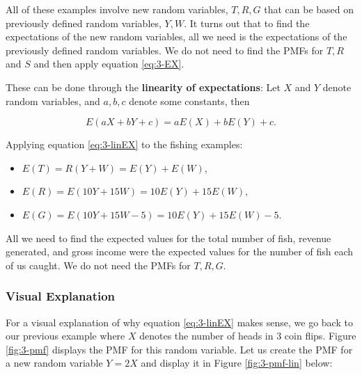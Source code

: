 \documentclass[
]{book}
\providecommand{\tightlist}{%
  \setlength{\itemsep}{0pt}\setlength{\parskip}{0pt}}
\begin{document}
All of these examples involve new random variables, \(T, R, G\) that can be based on previously defined random variables, \(Y, W\). It turns out that to find the expectations of the new random variables, all we need is the expectations of the previously defined random variables. We do not need to find the PMFs for \(T, R\) and \(S\) and then apply equation \eqref{eq:3-EX}.

These can be done through the \textbf{linearity of expectations}: Let \(X\) and \(Y\) denote random variables, and \(a,b,c\) denote some constants, then

\begin{equation} 
E(aX + bY + c) = aE(X) + bE(Y) + c.
\label{eq:3-linEX}
\end{equation}

Applying equation \eqref{eq:3-linEX} to the fishing examples:

\begin{itemize}
\tightlist
\item
  \(E(T) = R(Y + W) = E(Y) + E(W)\),
\item
  \(E(R) = E(10Y + 15W) = 10E(Y) + 15E(W)\),
\item
  \(E(G) = E(10Y + 15W - 5) = 10E(Y) + 15E(W) - 5\).
\end{itemize}

All we need to find the expected values for the total number of fish, revenue generated, and gross income were the expected values for the number of fish each of us caught. We do not need the PMFs for \(T,R,G\).

\hypertarget{visual-explanation}{%
\subsubsection{Visual Explanation}\label{visual-explanation}}

For a visual explanation of why equation \eqref{eq:3-linEX} makes sense, we go back to our previous example where \(X\) denotes the number of heads in 3 coin flips. Figure \ref{fig:3-pmf} displays the PMF for this random variable. Let us create the PMF for a new random variable \(Y=2X\) and display it in Figure \ref{fig:3-pmf-lin} below:
\end{document}
